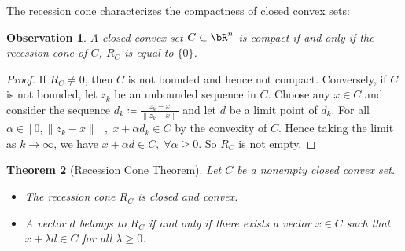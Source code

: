 \documentclass[11pt,a4paper,oneside,openany]{book}
\newtheorem{theorem}{Theorem}
\newtheorem{observation}[theorem]{Observation}
\numberwithin{definition}{section}
\numberwithin{theorem}{section}
\numberwithin{problem}{section}
\begin{document}
The recession cone characterizes the compactness of closed convex sets:
\begin{observation}
    A closed convex set $C \subset \bR^n$ is compact if and only if the recession cone of $C$, $R_C$ is equal to $\{0\}$.
\end{observation}
\begin{proof}
     If $R_C \neq {0}$, then $C$ is not bounded and hence not compact. Conversely, if $C$ is not bounded, let ${z_k}$ be an unbounded sequence in $C$. Choose any $x \in C$ and consider the sequence $d_k \coloneqq \frac{z_k - x}{\|z_k - x\|}$ and let $d$ be a limit point of ${d_k}$. For all $\alpha \in [0, \|z_k - x\|], \; x + \alpha d_k \in C$ by the convexity of $C$. Hence taking the limit as $k \to \infty$, we have $x + \alpha d \in C, \; \forall \alpha \geq 0$. So $R_C$ is not empty.
\end{proof}
\begin{theorem}[Recession Cone Theorem] \label{Recession Cone Theorem}
    Let \( C \) be a nonempty closed convex set.
    \begin{itemize}
        \item The recession cone \( R_C \) is closed and convex.
        \item A vector \( d \) belongs to \( R_C \) if and only if there exists a vector \( x \in C \) such that \( x + \lambda d \in C \) for all \( \lambda \geq 0 \).
    \end{itemize}
\end{theorem}
\end{document}
